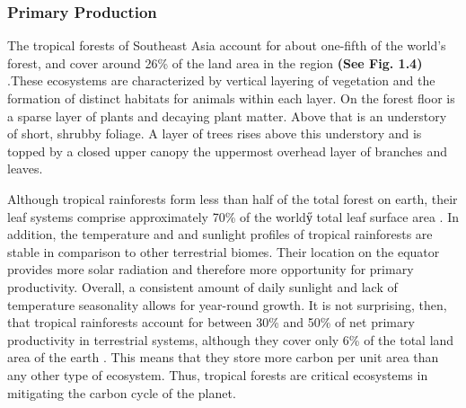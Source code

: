 \subsubsection{Primary Production}


  
  
  
  The tropical forests of Southeast Asia account for about one-fifth of the world's forest, and cover around 26\% of the land area in the region \textbf{(See Fig. 1.4)} \citep{brown2003state}.These ecosystems are characterized by vertical layering of vegetation and the formation of distinct habitats for animals within each layer. On the forest floor is a sparse layer of plants and decaying plant matter. Above that is an understory of short, shrubby foliage. A layer of trees rises above this understory and is topped by a closed upper canopy the uppermost overhead layer of branches and leaves.
  
  Although tropical rainforests form less than half of the total forest on earth, their leaf systems comprise approximately 70\% of the worldӳ total leaf surface area \citep{gower1999direct}. In addition, the temperature and and sunlight profiles of tropical rainforests are stable in comparison to other terrestrial biomes. Their location on the equator provides more solar radiation and therefore more opportunity for primary productivity. Overall, a consistent amount of daily sunlight and lack of temperature seasonality allows for year-round growth.   It is not surprising, then, that tropical rainforests account for between 30\% and 50\% of net primary productivity in terrestrial systems, although they cover only 6\% of the total land area of the earth \citep{houghton2005aboveground}. This means that they store more carbon per unit area than any other type of ecosystem. Thus, tropical forests are critical ecosystems in mitigating the carbon cycle of the planet. 
  
